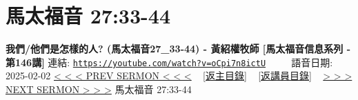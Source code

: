 \documentclass{book}
\begin{document}
\section{馬太福音 27:33-44}
\label{sec:oCpi7n8ictU}
\textbf{我們/他們是怎樣的人? (馬太福音27\_33-44) - 黃紹權牧師  [馬太福音信息系列 - 第146講]}
\newline
\newline
連結: \href{https://youtube.com/watch?v=oCpi7n8ictU}{\texttt{https://youtube.com/watch?v=oCpi7n8ictU}} ~~~~ 語音日期: 2025-02-02
\newline
\newline
\hyperref[sec:HaaLhKYBRSg]{< < < PREV SERMON < < <}
~
\hyperlink{toc}{[返主目錄]}
~
\hyperref[ch:preacher18]{[返講員目錄]}
~
\hyperref[sec:7upP8JmD6zY]{> > > NEXT SERMON > > >}
\newline
\newline
馬太福音 27:33-44
\newline
\end{document}
